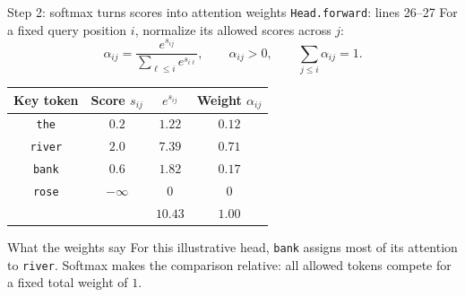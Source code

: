 \begin{frame}{Step 2: softmax turns scores into attention weights
  \hfill{\tiny \texttt{Head.forward}: lines 26--27}}
  \small
  For a fixed query position $i$, normalize its allowed scores across $j$:
  \[
    \alpha_{ij}=\frac{e^{s_{ij}}}{\sum_{\ell\le i}e^{s_{i\ell}}},
    \qquad \alpha_{ij}>0,
    \qquad \sum_{j\le i}\alpha_{ij}=1.
  \]

  \begin{center}
    \renewcommand{\arraystretch}{1.25}
    \begin{tabular}{c|c|c|c}
      Key token & Score $s_{ij}$ & $e^{s_{ij}}$ & Weight $\alpha_{ij}$ \\
      \hline
      \texttt{the}   & $0.2$ & $1.22$ & $0.12$ \\
      \texttt{river} & $2.0$ & $7.39$ & $0.71$ \\
      \texttt{bank}  & $0.6$ & $1.82$ & $0.17$ \\
      \texttt{rose}  & $-\infty$ & $0$ & $0$ \\
      \hline
      & & $10.43$ & $1.00$
    \end{tabular}
  \end{center}

  \begin{alertblock}{What the weights say}
    For this illustrative head, \texttt{bank} assigns most of its attention to
    \texttt{river}. Softmax makes the comparison relative: all allowed tokens
    compete for a fixed total weight of $1$.
  \end{alertblock}
\end{frame}

